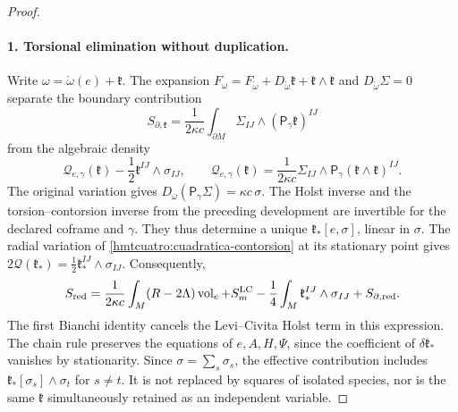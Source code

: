 \begin{proof}
\paragraph{1. Torsional elimination without duplication.}
Write \(\omega=\mathring\omega(e)+\mathfrak k\). The expansion \(F_\omega=F_{\mathring\omega}
+D_{\mathring\omega}\mathfrak k+\mathfrak k\wedge\mathfrak k\) and \(D_{\mathring\omega}\Sigma=0\) separate the boundary contribution
\[
 S_{\partial,\mathfrak k}
 =\frac1{2\kappa c}\int_{\partial M}
                  \Sigma_{IJ}\wedge(\mathsf P_\gamma\mathfrak k)^{IJ}
\]
from the algebraic density
\begin{equation}
 \mathcal Q_{e,\gamma}(\mathfrak k)
       -\frac12\mathfrak k^{IJ}\wedge\sigma_{IJ},\qquad
 \mathcal Q_{e,\gamma}(\mathfrak k)=\frac1{2\kappa c}
       \Sigma_{IJ}\wedge
       \mathsf P_\gamma(\mathfrak k\wedge\mathfrak k)^{IJ}.
 \label{hmtcuatro:cuadratica-contorsion}
\end{equation}
The original variation gives \(D_\omega(\mathsf P_\gamma\Sigma)=\kappa c\,\sigma\). The Holst inverse and the torsion--contorsion inverse from the preceding development are invertible for the declared coframe and \(\gamma\). They thus determine a unique \(\mathfrak k_*[e,\sigma]\), linear in \(\sigma\). The radial variation of \eqref{hmtcuatro:cuadratica-contorsion} at its stationary point gives \(2\mathcal Q(\mathfrak k_*)=\frac12\mathfrak k_*^{IJ}\wedge\sigma_{IJ}\). Consequently,
\begin{equation}
 S_{\rm red}=\frac1{2\kappa c}\int_M(R-2\Lambda)\operatorname{vol}_e
       +S_m^{\rm LC}
       -\frac14\int_M\mathfrak k_*^{IJ}\wedge\sigma_{IJ}
       +S_{\partial,\rm red}.
 \label{hmtcuatro:accion-reducida}
\end{equation}
The first Bianchi identity cancels the Levi--Civita Holst term in this expression. The chain rule preserves the equations of \(e,A,H,\Psi\), since the coefficient of \(\delta\mathfrak k_*\) vanishes by stationarity. Since \(\sigma=\sum_s\sigma_s\), the effective contribution includes \(\mathfrak k_*[\sigma_s]\wedge\sigma_t\) for \(s\ne t\). It is not replaced by squares of isolated species, nor is the same \(\mathfrak k\) simultaneously retained as an independent variable.


\end{proof}
